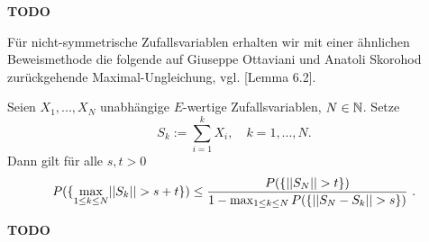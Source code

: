 \begin{proof*}
    \textbf{TODO}
\end{proof*}

Für nicht-symmetrische Zufallsvariablen erhalten wir mit einer ähnlichen Beweismethode die folgende auf Giuseppe Ottaviani und Anatoli Skorohod zurückgehende Maximal-Ungleichung, vgl. \cite{ledoux-talagrand}[Lemma 6.2]. 
\begin{theorem}
    Seien $X_1,...,X_N$ unabhängige $E$-wertige Zufallsvariablen, $N \in \mathbb{N}$. Setze 
    $$
        S_k := \sum_{i=1}^kX_i, \quad k = 1,...,N. 
    $$
    Dann gilt für alle $s,t > 0$
    \begin{align}
        P(\{ \max_{1 \leq k \leq N} \lvert \lvert S_k \rvert \rvert > s + t \}) \leq \frac{P(\{\lvert \lvert S_N \rvert \rvert > t \})}{1 - \max_{1 \leq k \leq N}P(\{ \lvert \lvert S_N - S_k \rvert \rvert > s \})} \ . 
    \end{align}
\end{theorem}

\begin{proof*}
    \textbf{TODO}
\end{proof*}